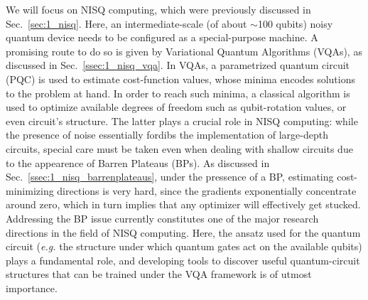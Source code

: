 We will focus on NISQ computing, which were previously discussed in Sec.~\ref{sec:1_nisq}. Here, an intermediate-scale (of about $\sim$100 qubits) noisy quantum device needs to be configured as a special-purpose machine. A promising route to do so is given by Variational Quantum Algorithms (VQAs), as discussed in Sec.~\ref{ssec:1_nisq_vqa}. In VQAs, a parametrized quantum circuit (PQC) is used to estimate cost-function values, whose minima encodes solutions to the problem at hand. In order to reach such minima, a classical algorithm is used to optimize available degrees of freedom such as qubit-rotation values, or even circuit's structure. The latter plays a crucial role in NISQ computing: while the presence of noise essentially fordibs the implementation of large-depth circuits, special care must be taken even when dealing with shallow circuits due to the appearence of Barren Plateaus (BPs). As discussed in Sec.~\ref{ssec:1_nisq_barrenplateaus}, under the pressence of a BP, estimating cost-minimizing directions is very hard, since the gradients exponentially concentrate around zero, which in turn implies that any optimizer will effectively get stucked. Addressing the BP issue currently constitutes one of the major research directions in the field of NISQ computing. Here, the ansatz used for the quantum circuit (\textit{e.g.} the structure under which quantum gates act on the available qubits) plays a fundamental role, and developing tools to discover useful quantum-circuit structures that can be trained under the VQA framework is of utmost importance.

